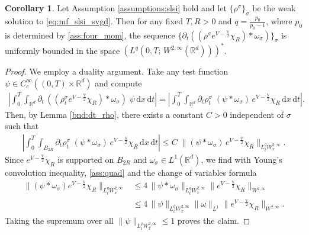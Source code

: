 \documentclass[reqno, 11pt]{amsart}
\numberwithin{equation}{section}
\theoremstyle{definition}
\newtheorem{cor}[thm]{Corollary}
\begin{document}
\begin{cor}
    \label{bnd:dt_rho_chi_slsi}
    Let Assumption \ref{assumptions:slsi} hold and let $\{\rho^\sigma\}_\sigma$ be the weak solution to \eqref{eq:mf_slsi_svgd}. Then for any fixed $T,R>0$ and $q=\frac{p_0}{p_0-1}$, where $p_0$ is determined by \ref{ass:four_mom}, the sequence $\{\partial_t((\rho^\sigma e^{V-\frac{\mathbb{V}}{2}}\chi_R)\ast\omega_\sigma)\}_\sigma$ is uniformly bounded in the space $(L^q(0,T;\, W^{2,\infty}(\mathbb{R}^{d})))^\ast$.
\end{cor}
\begin{proof}
    We employ a duality argument. Take any test function $\psi\in C_c^\infty((0,T)\times \mathbb{R}^{d})$ and compute
    \begin{align*}
        \left\vert \int_0^T\int_{\mathbb{R}^{d}} \partial_t\,((\rho_t^\sigma e^{V-\frac{\mathbb{V}}{2}}\chi_R)\ast\omega_\sigma)\; \psi\,\mathrm{d} x\,\mathrm{d} t\right\vert
        =\left\vert \int_0^T\int_{\mathbb{R}^{d}} \partial_t\rho_t^\sigma\;  (\psi\ast \omega_\sigma)\, e^{V-\frac{\mathbb{V}}{2}}\chi_R\,\mathrm{d} x\,\mathrm{d} t\right\vert.
    \end{align*}
    Then, by Lemma \ref{bnd:dt_rho}, there exists a constant $C>0$ independent of $\sigma$ such that
    \begin{align*}
        \left\vert \int_0^T\int_{B_{2R}} \partial_t\rho_t^\sigma \; (\psi\ast \omega_\sigma)\, e^{V-\frac{\mathbb{V}}{2}}\chi_R\,\mathrm{d} x\,\mathrm{d} t\right\vert
        \leq C\;\|(\psi\ast \omega_\sigma) \,e^{V-\frac{\mathbb{V}}{2}}\chi_R\|_{L_t^q W_x^{2,\infty}}.
    \end{align*}
    Since $e^{V-\frac{\mathbb{V}}{2}}\chi_R$ is supported on $B_{2R}$ and $\omega_\sigma\in L^1(\mathbb{R}^{d})$, we find with Young's convolution inequality, \ref{ass:quad} and the change of variables formula
    \begin{align*}
        \|(\psi\ast \omega_\sigma) e^{V-\frac{\mathbb{V}}{2}}\chi_R\|_{L_t^q W_x^{2,\infty}}
        &\leq 4\,\|\psi\ast \omega_\sigma \|_{L_t^q W_x^{2,\infty}}\|e^{V-\frac{\mathbb{V}}{2}}\chi_R\|_{W^{2,\infty}}\\
        &\leq 4\,\|\psi\|_{L_t^q W_x^{2,\infty}}\|\omega\|_{L^1}\|e^{V-\frac{\mathbb{V}}{2}}\chi_R\|_{W^{2,\infty}}.
    \end{align*}
    Taking the supremum over all $\|\psi\|_{L_t^q W_x^{2,\infty}}\leq 1$ proves the claim.
\end{proof}
\end{document}
